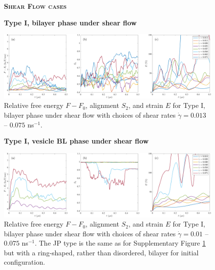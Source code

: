 \begin{figure}[h!]
\begin{center}
\textbf{\textsc{Shear Flow cases}}\par\medskip
\textbf{Type I, bilayer phase under shear flow}\par\medskip
\includegraphics[width=\textwidth]{SMFigures/ULShRaw.pdf}
\end{center}
\caption{
Relative free energy $F - F_0$,
alignment $S_2$, and strain $E$ for
Type I, bilayer phase under shear flow with choices of shear rates $\dot\gamma=0.013$ -- $0.075$ ns$^{-1}$.
}
\label{fig:ulshraw}
\end{figure}


\begin{figure}[h!]
\begin{center}
\textbf{Type I, vesicle BL phase under shear flow}\par\medskip
\includegraphics[width=\textwidth]{SMFigures/VeShRaw.pdf}
\end{center}
\caption{
Relative free energy $F - F_0$,
alignment $S_2$, and strain $E$ for
Type I, bilayer phase under shear flow with choices of shear rates $\dot\gamma=0.01$ -- $0.075$ ns$^{-1}$.
The JP type is the same as for Supplementary Figure \ref{fig:ulshraw} but with a
ring-shaped, rather than disordered, bilayer for initial configuration.  
}
\label{fig:veshraw}
\end{figure}


